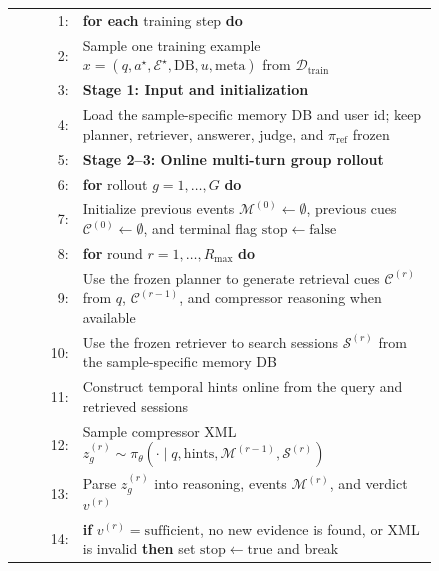 \begin{tcolorbox}
\vspace{0.35em}
\begin{tabular}{@{}r@{\quad}p{0.84\linewidth}@{}}
1: & \textbf{for each} training step \textbf{do} \\
2: & \hspace*{1em}Sample one training example $x=(q,a^\star,\mathcal{E}^\star,\mathrm{DB},u,\mathrm{meta})$ from $\mathcal{D}_{\mathrm{train}}$ \\
3: & \hspace*{1em}\textbf{Stage 1: Input and initialization} \\
4: & \hspace*{2em}Load the sample-specific memory DB and user id; keep planner, retriever, answerer, judge, and $\pi_{\mathrm{ref}}$ frozen \\
5: & \hspace*{1em}\textbf{Stage 2--3: Online multi-turn group rollout} \\
6: & \hspace*{2em}\textbf{for} rollout $g=1,\ldots,G$ \textbf{do} \\
7: & \hspace*{3em}Initialize previous events $\mathcal{M}^{(0)}\leftarrow\emptyset$, previous cues $\mathcal{C}^{(0)}\leftarrow\emptyset$, and terminal flag $\mathrm{stop}\leftarrow\mathrm{false}$ \\
8: & \hspace*{3em}\textbf{for} round $r=1,\ldots,R_{\max}$ \textbf{do} \\
9: & \hspace*{4em}Use the frozen planner to generate retrieval cues $\mathcal{C}^{(r)}$ from $q$, $\mathcal{C}^{(r-1)}$, and compressor reasoning when available \\
10: & \hspace*{4em}Use the frozen retriever to search sessions $\mathcal{S}^{(r)}$ from the sample-specific memory DB \\
11: & \hspace*{4em}Construct temporal hints online from the query and retrieved sessions \\
12: & \hspace*{4em}Sample compressor XML $z_g^{(r)}\sim\pi_\theta(\cdot\mid q,\mathrm{hints},\mathcal{M}^{(r-1)},\mathcal{S}^{(r)})$ \\
13: & \hspace*{4em}Parse $z_g^{(r)}$ into reasoning, events $\mathcal{M}^{(r)}$, and verdict $v^{(r)}$ \\
14: & \hspace*{4em}\textbf{if} $v^{(r)}=\mathrm{sufficient}$, no new evidence is found, or XML is invalid \textbf{then} set $\mathrm{stop}\leftarrow\mathrm{true}$ and break \\

\end{tabular}
\end{tcolorbox}
